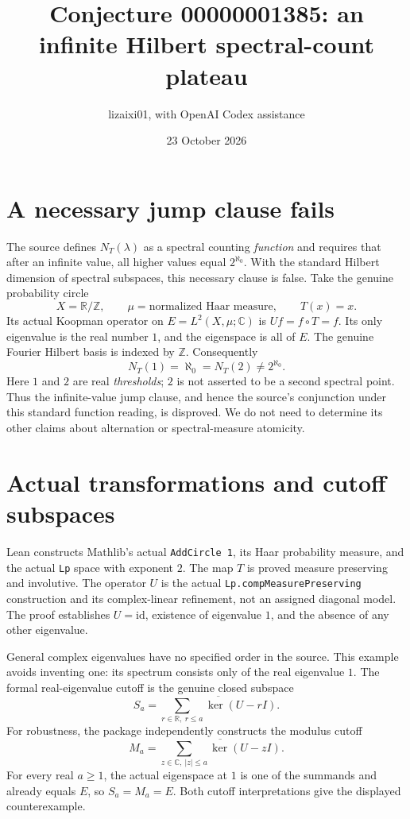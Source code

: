 \documentclass[11pt]{article}
\title{Conjecture 00000001385: an infinite Hilbert spectral-count plateau}
\author{lizaixi01, with OpenAI Codex assistance}
\date{23 October 2026}
\begin{document}
\maketitle
\section{A necessary jump clause fails}
The source defines $N_T(\lambda)$ as a spectral counting
\emph{function} and requires that after an infinite value, all
higher values equal $2^{\aleph_0}$. With the standard Hilbert
dimension of spectral subspaces, this necessary clause is false.
Take the genuine probability circle
\[
 X=\mathbb R/\mathbb Z,\qquad \mu=\text{normalized Haar measure},
 \qquad T(x)=x.
\]
Its actual Koopman operator on $E=L^2(X,\mu;\mathbb C)$ is
$Uf=f\circ T=f$. Its only eigenvalue is the real number $1$,
and the eigenspace is all of $E$. The genuine Fourier Hilbert
basis is indexed by $\mathbb Z$. Consequently
\[
 N_T(1)=\aleph_0=N_T(2)\ne 2^{\aleph_0}.
\]
Here $1$ and $2$ are real \emph{thresholds}; $2$ is not asserted
to be a second spectral point. Thus the infinite-value jump
clause, and hence the source's conjunction under this standard
function reading, is disproved. We do not need to determine its
other claims about alternation or spectral-measure atomicity.

\section{Actual transformations and cutoff subspaces}
Lean constructs Mathlib's actual \texttt{AddCircle 1}, its Haar
probability measure, and the actual \texttt{Lp} space with exponent
$2$. The map $T$ is proved measure preserving and involutive.
The operator $U$ is the actual
\texttt{Lp.compMeasurePreserving} construction and its
complex-linear refinement, not an assigned diagonal model.
The proof establishes $U=\mathrm{id}$, existence of eigenvalue
$1$, and the absence of any other eigenvalue.

General complex eigenvalues have no specified order in the
source. This example avoids inventing one: its spectrum consists
only of the real eigenvalue $1$. The formal real-eigenvalue cutoff
is the genuine closed subspace
\[
 S_a=\overline{\sum_{r\in\mathbb R,\ r\leq a}\ker(U-rI)}.
\]
For robustness, the package independently constructs the modulus
cutoff
\[
 M_a=\overline{\sum_{z\in\mathbb C,\ |z|\leq a}\ker(U-zI)}.
\]
For every real $a\geq1$, the actual eigenspace at $1$ is one of
the summands and already equals $E$, so $S_a=M_a=E$.
Both cutoff interpretations give the displayed counterexample.
\end{document}
